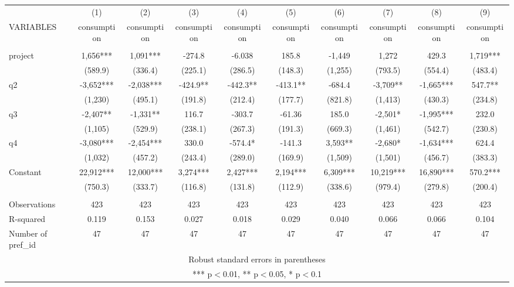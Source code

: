 \documentclass[]{article}
\begin{document}
\begin{tabular}{lccccccccc} \hline
 & (1) & (2) & (3) & (4) & (5) & (6) & (7) & (8) & (9) \\
VARIABLES & consumption & consumption & consumption & consumption & consumption & consumption & consumption & consumption & consumption \\ \hline
 &  &  &  &  &  &  &  &  &  \\
project & 1,656*** & 1,091*** & -274.8 & -6.038 & 185.8 & -1,449 & 1,272 & 429.3 & 1,719*** \\
 & (589.9) & (336.4) & (225.1) & (286.5) & (148.3) & (1,255) & (793.5) & (554.4) & (483.4) \\
q2 & -3,652*** & -2,038*** & -424.9** & -442.3** & -413.1** & -684.4 & -3,709** & -1,665*** & 547.7** \\
 & (1,230) & (495.1) & (191.8) & (212.4) & (177.7) & (821.8) & (1,413) & (430.3) & (234.8) \\
q3 & -2,407** & -1,331** & 116.7 & -303.7 & -61.36 & 185.0 & -2,501* & -1,995*** & 232.0 \\
 & (1,105) & (529.9) & (238.1) & (267.3) & (191.3) & (669.3) & (1,461) & (542.7) & (230.8) \\
q4 & -3,080*** & -2,454*** & 330.0 & -574.4* & -141.3 & 3,593** & -2,680* & -1,634*** & 624.4 \\
 & (1,032) & (457.2) & (243.4) & (289.0) & (169.9) & (1,509) & (1,501) & (456.7) & (383.3) \\
Constant & 22,912*** & 12,000*** & 3,274*** & 2,427*** & 2,194*** & 6,309*** & 10,219*** & 16,890*** & 570.2*** \\
 & (750.3) & (333.7) & (116.8) & (131.8) & (112.9) & (338.6) & (979.4) & (279.8) & (200.4) \\
 &  &  &  &  &  &  &  &  &  \\
Observations & 423 & 423 & 423 & 423 & 423 & 423 & 423 & 423 & 423 \\
R-squared & 0.119 & 0.153 & 0.027 & 0.018 & 0.029 & 0.040 & 0.066 & 0.066 & 0.104 \\
 Number of pref\_id & 47 & 47 & 47 & 47 & 47 & 47 & 47 & 47 & 47 \\ \hline
\multicolumn{10}{c}{ Robust standard errors in parentheses} \\
\multicolumn{10}{c}{ *** p$<$0.01, ** p$<$0.05, * p$<$0.1} \\
\end{tabular}
\end{document}
